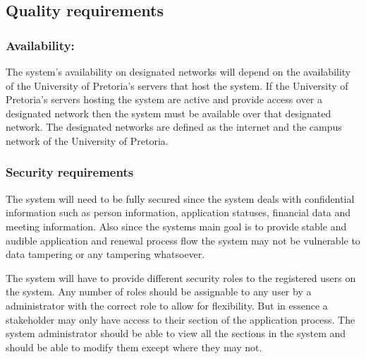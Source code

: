 \documentclass[12pt]{article}
\begin{document}
		\vspace{0.2in}
		
		\subsection{Quality requirements} %
		\vspace{0.2in}
		
		\subsubsection{Availability:}
				
		\begin{flushleft}
		
		The system's availability on designated networks will depend on the availability of the University of Pretoria's servers that host the system. If the University of Pretoria's servers hosting the system are active and provide access over a designated network then the system must be available over that designated network. The designated networks are defined as the internet and the campus network of the University of Pretoria.
		
		\end{flushleft}
		
		\vspace{0.1in}
				
		\subsubsection{Security requirements}
		
		\begin{flushleft}
		
		The system will need to be fully secured since the system deals with confidential information such as person information, application statuses, financial data and meeting information. Also since the systems main goal is to provide stable and audible application and renewal process flow the system may not be vulnerable to data tampering or any tampering whatsoever. \\
		\vspace{0.1in}
		  
		The system will have to provide different security roles to the registered users on the system. Any number of roles should be assignable to any user by a administrator with the correct role to allow for flexibility. 
		But in essence a stakeholder may only have access to their section of the application process. The system administrator should be able to view all the sections in the system and should be able to modify them except where they may not.
		
		\end{flushleft}
		
\end{document}
